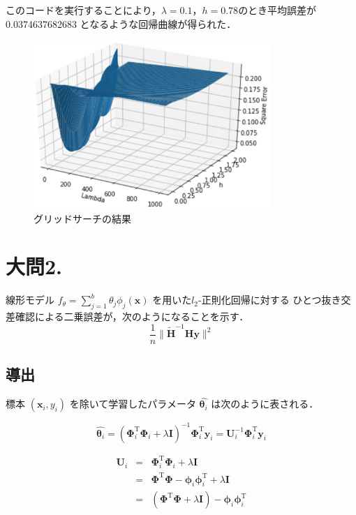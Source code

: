 \documentclass[fleqn]{jsarticle}
\begin{document}
\noindent
このコードを実行することにより，$\lambda=0.1$，$h=0.78$のとき平均誤差が 0.0374637682683 となるような回帰曲線が得られた．

\begin{figure}[h]
  \begin{center}
    \includegraphics[width=0.8\textwidth]{figs/cross_validation.eps}
  \end{center}
  \caption{グリッドサーチの結果}
\end{figure}



\section*{大問2.}
線形モデル $f_\theta = \sum_{j=1}^b \theta_j \phi_j(\mathbf{x})$ を用いた$l_2$-正則化回帰に対する
ひとつ抜き交差確認による二乗誤差が，次のようになることを示す．
\begin{equation*}
  \frac{1}{n} \| \tilde{\mathbf{H}}^{-1} \mathbf{H} \mathbf{y} \|^2
\end{equation*}

\subsection*{導出}
  標本 $(\mathbf{x}_i, y_i)$ を除いて学習したパラメータ $\hat{\mathbf{\theta}_i}$ は次のように表される．

  \begin{equation*}
    \hat{\mathbf{\theta}_i} = (\mathbf{\Phi}_i^\mathrm{T} \mathbf{\Phi}_i + \lambda \mathbf{I})^{-1} \mathbf{\Phi}_i^\mathrm{T} \mathbf{y}_i
    = \mathbf{U}_i^{-1} \mathbf{\Phi}_i^\mathrm{T} \mathbf{y}_i
  \end{equation*}

  \begin{eqnarray*}
    \mathbf{U}_i &=& \mathbf{\Phi}_i^\mathrm{T} \mathbf{\Phi}_i + \lambda \mathbf{I}\\
    &=& \mathbf{\Phi}^\mathrm{T} \mathbf{\Phi} - \mathbf{\phi}_i \mathbf{\phi}_i^\mathrm{T} + \lambda \mathbf{I}\\
    &=& (\mathbf{\Phi}^\mathrm{T} \mathbf{\Phi} + \lambda \mathbf{I})- \mathbf{\phi}_i \mathbf{\phi}_i^\mathrm{T} \\
  \end{eqnarray*}
\end{document}
